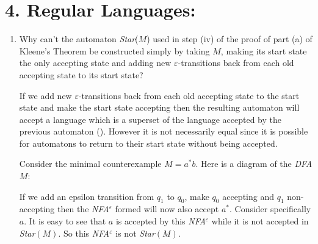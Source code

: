 \documentclass[10pt,\jkfside,a4paper]{article}
\newcommand{\dfa}{\textit{DFA} }
\newcommand{\nfae}{\textit{NFA}$^\varepsilon$ }
\begin{document}
\section*{4. Regular Languages:}

\begin{enumerate}

\item Why can’t the automaton \textit{Star}($M$) used in step (iv) of the proof of part (a)
of Kleene’s Theorem be constructed simply by taking $M$, making its start state the only
accepting state and adding new $\varepsilon$-transitions back from each old accepting state 
to its start state?

If we add new $\varepsilon$-transitions back from each old accepting state to the start state 
and make the start state accepting then the resulting automaton will accept a language which 
is a superset of the language accepted by the previous automaton (\dag). However it is not necessarily 
equal since it is possible for automatons to return to their start state without being 
accepted.

Consider the minimal counterexample $M = a^*b$. Here is a diagram of the \dfa $M$:

\begin{center}
\end{center}

If we add an epsilon transition from $q_1$ to $q_0$, make $q_0$ accepting and $q_1$ non-accepting 
then the \nfae formed will now also accept $a^*$. Consider specifically $a$. It is easy to 
see that $a$ is accepted by this \nfae while it is not accepted in \textit{Star}$(M)$. 
So this \nfae is not \textit{Star}$(M)$.


\end{enumerate}
\end{document}

